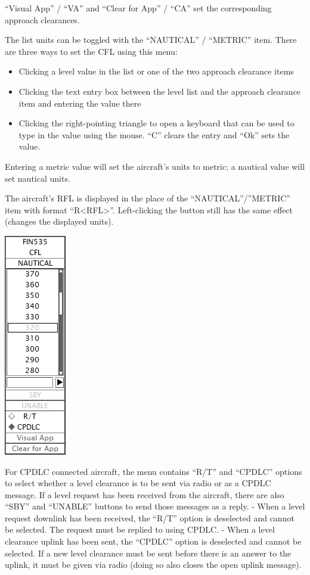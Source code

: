 \documentclass[11pt,a4paper,oldfontcommands]{memoir}
\begin{document}
“Visual App” / “VA” and “Clear for App” / “CA” set the corresponding approach
clearances.

The list units can be toggled with the “NAUTICAL” / “METRIC” item. There are three
ways to set the CFL using this menu:

\begin{itemize}
        \item Clicking a level value in the list or one of the two approach clearance items
        \item Clicking the text entry box between the level list and the approach clearance item and entering the value there
        \item Clicking the right-pointing triangle to open a keyboard that can be used to type in the value using the mouse. “C” clears the entry and “Ok” sets the value.
\end{itemize}

Entering a metric value will set the aircraft’s units to metric; a nautical value will set
nautical units.

The aircraft’s RFL is displayed in the place of the “NAUTICAL”/”METRIC” item with
format “R<RFL>”. Left-clicking the button still has the same effect (changes the
displayed units).

\includegraphics{img/cfldl.png}

For CPDLC connected aircraft, the menu contains “R/T” and “CPDLC” options to select
whether a level clearance is to be sent via radio or as a CPDLC message.
If a level request has been received from the aircraft, there are also “SBY” and
“UNABLE” buttons to send those messages as a reply.
- When a level request downlink has been received, the “R/T” option is deselected and
cannot be selected. The request must be replied to using CPDLC.
- When a level clearance uplink has been sent, the “CPDLC” option is deselected and
cannot be selected. If a new level clearance must be sent before there is an answer to
the uplink, it must be given via radio (doing so also closes the open uplink message).
\end{document}
